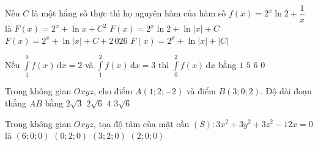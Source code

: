 \begin{ex}%
	Nếu $C$ là một hắng số thực thì họ nguyên hàm của hàm số $f(x)=2^x\ln 2+\dfrac{1}{x}$ là
	\choice
	{$F(x)=2^x+\ln x +C^2$}
	{$F(x)=2^x\ln 2+\ln|x|+C$}
	{\True $F(x)=2^x+\ln|x|+C+2\,026$}
	{$F(x)=2^x+\ln|x|+|C|$}
\end{ex}

\begin{ex}%
	Nếu $\displaystyle\int\limits_1^0 f(x)\mathrm{\,d}x = 2$ và $\displaystyle\int\limits_1^2 f(x)\mathrm{\,d}x = 3$ thì $\displaystyle\int\limits_0^2 f(x)\mathrm{\,d}x$ bằng
	\choice
	{\True $1$}
	{$5$}
	{$6$}
	{$0$}
\end{ex}

\begin{ex}%
	Trong không gian $Oxyz$, cho điểm $A(1;2;-2)$ và điểm $B(3;0;2)$. Độ dài đoạn thẳng $AB$ bằng
	\choice
	{$2\sqrt{3}$}
	{\True $2\sqrt{6}$}
	{$4$}
	{$3\sqrt{6}$}
\end{ex}

\begin{ex}%
	Trong không gian $Oxyz$, tọa độ tâm của mặt cầu
	$(S)\colon 3x^2+3y^2+3z^2-12x=0$
	là
	\choice
	{$(6;0;0)$}
	{$(0;2;0)$}
	{$(3;2;0)$}
	{\True $(2;0;0)$}
\end{ex}


